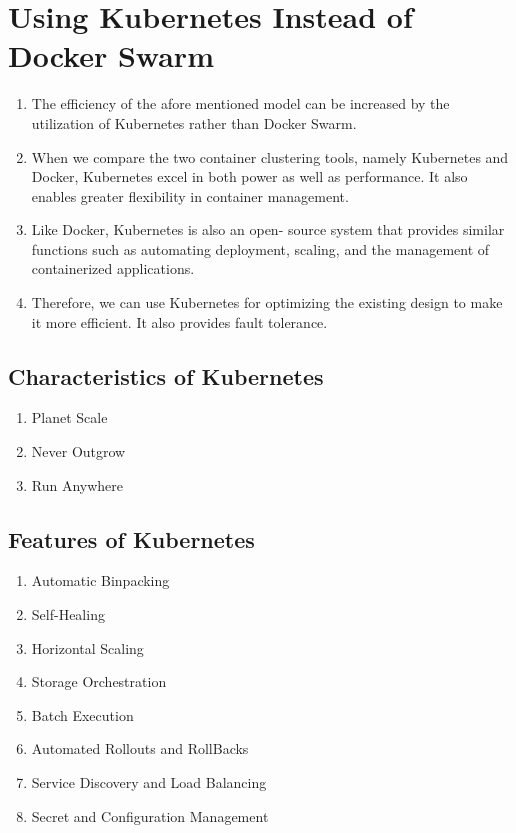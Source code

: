 \chapter{Using Kubernetes Instead of Docker Swarm}

\begin{enumerate}
    \item The efficiency of the afore mentioned model can be increased by the utilization of Kubernetes rather than Docker Swarm.
    \item When we compare the two container clustering tools, namely Kubernetes and Docker, Kubernetes excel in both power as well as performance. It also enables greater flexibility in container management.
    \item Like Docker, Kubernetes is also an open- source system that provides similar functions such as automating deployment, scaling, and the management of containerized applications.
    \item Therefore, we can use Kubernetes for optimizing the existing design to make it more efficient. It also provides fault tolerance.
\end{enumerate}

\section{Characteristics of Kubernetes}
\begin{enumerate}
    \item Planet Scale
    \item Never Outgrow
    \item Run Anywhere
\end{enumerate}

\section{Features of Kubernetes}
\begin{enumerate}
    \item Automatic Binpacking
    \item Self-Healing
    \item Horizontal Scaling
    \item Storage Orchestration
    \item Batch Execution
    \item Automated Rollouts and RollBacks
    \item Service Discovery and Load Balancing
    \item Secret and Configuration Management
\end{enumerate}